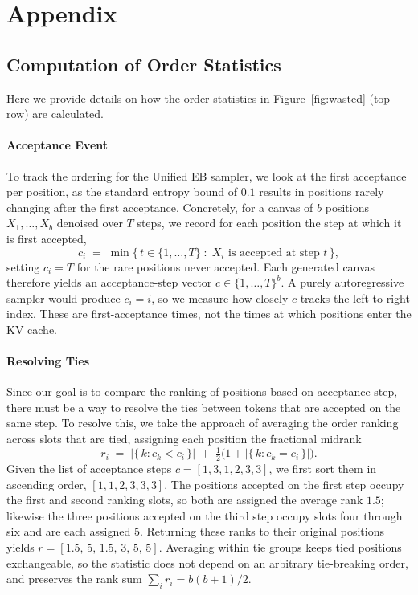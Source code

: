 \section{Appendix}

\subsection{Computation of Order Statistics}
\label{app:order-stats}
Here we provide details on how the order statistics in Figure~\ref{fig:wasted} (top row) are calculated.

\paragraph{Acceptance Event}
To track the ordering for the Unified EB sampler, we look at the first
acceptance per position, as the standard entropy bound of $0.1$ results in
positions rarely changing after the first acceptance. Concretely, for a
canvas of $b$ positions $X_1,\dots,X_b$ denoised over $T$ steps, we record
for each position the step at which it is first accepted,
\begin{equation}
  c_i \;=\; \min\bigl\{\, t \in \{1,\dots,T\} \;:\; X_i \text{ is accepted at step } t \,\bigr\},
\end{equation}
setting $c_i = T$ for the rare positions never accepted. Each generated
canvas therefore yields an acceptance-step vector $c \in \{1,\dots,T\}^{b}$. A
purely autoregressive sampler would produce $c_i = i$, so we measure how
closely $c$ tracks the left-to-right index. These are first-acceptance times, not the times at which positions enter the KV cache.

\paragraph{Resolving Ties}
Since our goal is to compare the ranking of positions based on acceptance
step, there must be a way to resolve the ties between tokens that are
accepted on the same step. To resolve this, we take the approach of
averaging the order ranking across slots that are tied, assigning each
position the fractional midrank
\begin{equation}
  r_i \;=\; \bigl|\{\,k : c_k < c_i\,\}\bigr|
        \;+\; \tfrac{1}{2}\bigl(1 + \bigl|\{\,k : c_k = c_i\,\}\bigr|\bigr).
\end{equation}
Given the list of acceptance steps $c = [1, 3, 1, 2, 3, 3]$, we first sort them
in ascending order, $[1, 1, 2, 3, 3, 3]$. The positions accepted on the
first step occupy the first and second ranking slots, so both are assigned
the average rank $1.5$; likewise the three positions accepted on the third
step occupy slots four through six and are each assigned $5$. Returning
these ranks to their original positions yields
$r = [1.5,\, 5,\, 1.5,\, 3,\, 5,\, 5]$. Averaging within tie groups keeps
tied positions exchangeable, so the statistic does not depend on an
arbitrary tie-breaking order, and preserves the rank sum
$\sum_i r_i = b(b+1)/2$.

